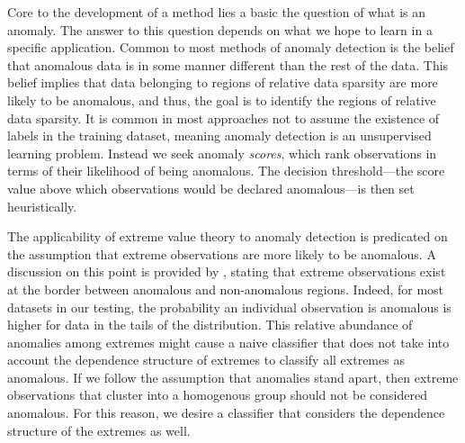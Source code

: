     Core to the 
    development of a method lies a basic the question of what is an anomaly.  
    The answer to this question depends on what we hope to
    learn in a specific application. Common to most 
    methods of anomaly detection is the belief that anomalous data is in some 
    manner different than the rest of the data. This belief implies that data 
    belonging to regions of relative data sparsity are more likely to be 
    anomalous, and thus, the goal is to identify the regions of relative 
    data sparsity. It is common in most approaches not to assume the existence 
    of labels in the training dataset, meaning anomaly detection is an 
    unsupervised learning problem.  Instead we seek anomaly \emph{scores}, 
    which rank observations in terms of their likelihood of being anomalous.  The 
    decision threshold---the score value above which observations would be 
    declared anomalous---is then set heuristically.

The applicability of extreme value theory to anomaly detection is predicated on 
    the assumption that extreme observations are more likely to be anomalous.  
    A discussion on this point is provided by \cite{goix2017}, stating that 
    extreme observations exist at the border between anomalous and non-anomalous 
    regions.  Indeed, for most datasets in our testing, the probability an 
    individual observation is anomalous is higher for data in the tails of the 
    distribution. This relative abundance of anomalies among extremes might 
    cause a naive classifier that does not take into account the dependence 
    structure of extremes to classify all extremes as anomalous.  If we follow 
    the assumption that anomalies stand apart, then extreme observations that 
    cluster into a homogenous group should not be considered anomalous.  For 
    this reason, we desire a classifier that considers the dependence structure 
    of the extremes as well.








